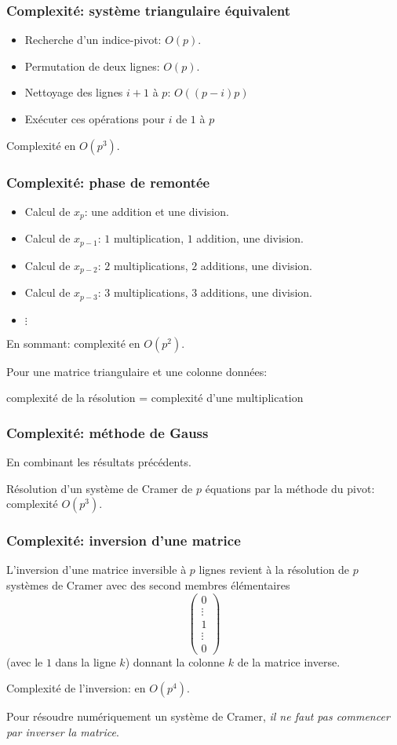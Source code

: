 \begin{frame}
  \frametitle{Complexité: système triangulaire équivalent}
\begin{itemize}
  \item Recherche d'un indice-pivot: $O(p)$.
  \item Permutation de deux lignes: $O(p)$.
  \item Nettoyage des lignes $i+1$ à $p$: $O((p-i)p)$
  \item Exécuter ces opérations pour $i$ de $1$ à $p$ 
\end{itemize}
Complexité en $O(p^3)$.
\end{frame}

\begin{frame}
  \frametitle{Complexité: phase de remontée}
\begin{itemize}
  \item Calcul de $x_p$: une addition et une division.
  \item Calcul de $x_{p-1}$: $1$ multiplication, $1$ addition, une division.
  \item Calcul de $x_{p-2}$: $2$ multiplications, $2$ additions, une division.
  \item Calcul de $x_{p-3}$: $3$ multiplications, $3$ additions, une division.
  \item $\vdots$
\end{itemize}
En sommant:  complexité en $O(p^2)$.

Pour une matrice triangulaire et une colonne données:
\begin{center}
complexité de la résolution = complexité d'une multiplication  
\end{center}
\end{frame}

\begin{frame}
  \frametitle{Complexité: méthode de Gauss}
En combinant les résultats précédents. 

Résolution d'un système de Cramer de $p$ équations par la méthode du pivot: complexité $O(p^3)$.
\end{frame}

\begin{frame}
\frametitle{Complexité: inversion d'une matrice}
L'inversion d'une matrice inversible à $p$ lignes revient à la résolution de $p$ systèmes de Cramer avec des second membres élémentaires
\begin{displaymath}
\begin{pmatrix}
0 \\ \vdots \\ 1 \\ \vdots \\0   
 \end{pmatrix}
\end{displaymath}
(avec le $1$ dans la ligne $k$) donnant la colonne $k$ de la matrice inverse.


 Complexité de l'inversion: en $O(p^4)$.
 
 Pour résoudre numériquement un système de Cramer, \emph{il ne faut pas commencer par inverser la matrice}.
\end{frame}

